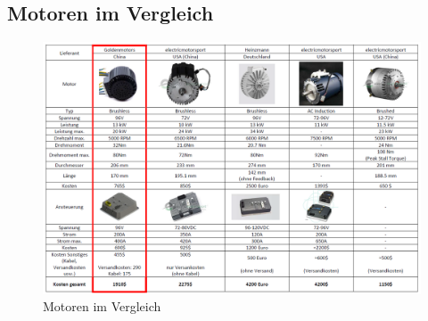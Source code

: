 
	\begin{landscape}
		\section{Motoren im Vergleich}\label{appsec:Motoren}
		\begin{figure}[H]
			\begin{center}
				\includegraphics[width=210mm]{appendix/Motoren.png}
				\caption[Motoren im Vergleich]{Motoren im Vergleich} %
				\label{fig:Motoren}
			\end{center}
		\end{figure}
	\end{landscape}
